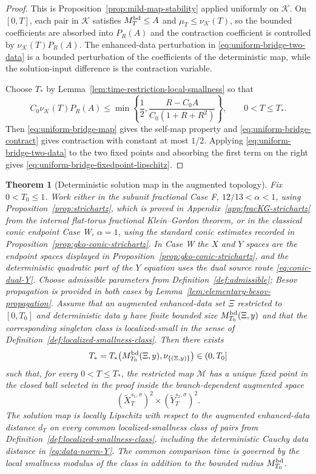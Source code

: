 \documentclass[10pt]{amsart}
\numberwithin{equation}{section}
\theoremstyle{plain}
\newtheorem{theorem}{Theorem}[section]
\theoremstyle{definition}
\theoremstyle{remark}
\begin{document}
\begin{proof}
This is Proposition~\ref{prop:mild-map-stability} applied uniformly on $\mathcal K$.  On $[0,T]$, each pair in $\mathcal K$ satisfies $M_T^{\rm bd}\le A$ and $\mu_T\le\nu_{\mathcal K}(T)$, so the bounded coefficients are absorbed into $P_R(A)$ and the contraction coefficient is controlled by $\nu_{\mathcal K}(T)P_R(A)$.  The enhanced-data perturbation in \eqref{eq:uniform-bridge-two-data} is a bounded perturbation of the coefficients of the deterministic map, while the solution-input difference is the contraction variable.

Choose $T_*$ by Lemma~\ref{lem:time-restriction-local-smallness} so that
\[
        C_0\nu_{\mathcal K}(T)P_R(A)
        \le \min\left\{\frac12,\frac{R-C_0 A}{C_0(1+R+R^2)}\right\},
        \qquad 0<T\le T_*.
\]
Then \eqref{eq:uniform-bridge-map} gives the self-map property and \eqref{eq:uniform-bridge-contract} gives contraction with constant at most $1/2$.  Applying \eqref{eq:uniform-bridge-two-data} to the two fixed points and absorbing the first term on the right gives \eqref{eq:uniform-bridge-fixedpoint-lipschitz}.
\end{proof}

\begin{theorem}[Deterministic solution map in the augmented topology]\label{thm:deterministic-closure}
Fix $0<T_0\le1$.  Work either in the subunit fractional Case F, $12/13<\alpha<1$, using Proposition~\ref{prop:strichartz}, which is proved in Appendix~\ref{app:fracKG-strichartz} from the internal flat-torus fractional Klein--Gordon theorem, or in the classical conic endpoint Case W, $\alpha=1$, using the standard conic estimates recorded in Proposition~\ref{prop:gko-conic-strichartz}.  In Case W the $X$ and $Y$ spaces are the endpoint spaces displayed in Proposition~\ref{prop:gko-conic-strichartz}, and the deterministic quadratic part of the $Y$ equation uses the dual source route \eqref{eq:conic-dual-Y}.  Choose admissible parameters from Definition~\ref{def:admissible}; Besov propagation is provided in both cases by Lemma~\ref{lem:elementary-besov-propagation}.  Assume that an augmented enhanced-data set $\Xi$ restricted to $[0,T_0]$ and deterministic data $y$ have finite bounded size $M_{T_0}^{\rm bd}(\Xi,y)$ and that the corresponding singleton class is localized-small in the sense of Definition~\ref{def:localized-smallness-class}.  Then there exists
\[
        T_*=T_*\bigl(M_{T_0}^{\rm bd}(\Xi,y),\nu_{\{(\Xi,y)\}}\bigr)\in(0,T_0]
\]
such that, for every $0<T\le T_*$, the restricted map $\mathcal M$ has a unique fixed point in the closed ball selected in the proof inside the branch-dependent augmented space
\[
 (\widetilde X_T^{s_1,\sigma})^2\times(\widetilde Y_T^{s_2,\sigma})^2.
\]
The solution map is locally Lipschitz with respect to the augmented enhanced-data distance $d_T$ on every common localized-smallness class of pairs from Definition~\ref{def:localized-smallness-class}, including the deterministic Cauchy data distance in \eqref{eq:data-norm-Y}.  The common comparison time is governed by the local smallness modulus of the class in addition to the bounded radius $M_{T_0}^{\rm bd}$.
\end{theorem}
\end{document}
